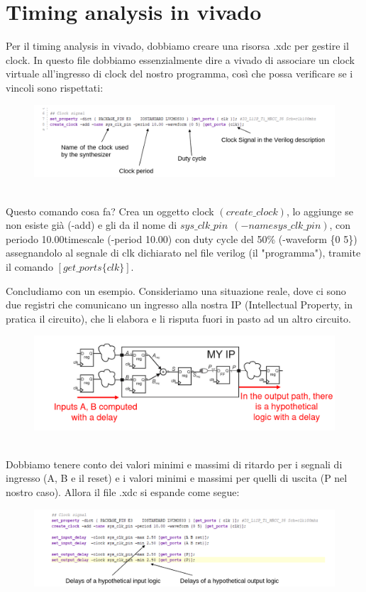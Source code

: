 \documentclass{book}
\begin{document}
    \section{Timing analysis in vivado}
    Per il timing analysis in vivado, dobbiamo creare una risorsa .xdc per gestire il clock.
    In questo file dobbiamo essenzialmente dire a vivado di associare un clock virtuale all'ingresso
    di clock del nostro programma, così che possa verificare se i vincoli sono rispettati:
    \begin{figure}[h!]
        \center  
        \includegraphics[width=0.7\linewidth]{img/chapt12img11.png}
    \end{figure} \\
    Questo comando cosa fa? Crea un oggetto clock $(create \_ clock)$, lo aggiunge se non esiste già (-add)
    e gli da il nome di $sys \_ clk \_ pin \ \ (-name sys\_clk\_pin)$, con periodo 10.00timescale (-period 10.00) con
    duty cycle del 50\% (-waveform \{0 5\}) assegnandolo al segnale di clk  dichiarato nel file verilog (il "programma"),
    tramite il comando $[get\_ports\{clk\}]$.

    Concludiamo con un esempio. Consideriamo una situazione reale, dove ci sono due 
    registri che comunicano un ingresso alla nostra IP (Intellectual Property, in pratica il circuito), che li 
    elabora e li risputa fuori in pasto ad un altro circuito.
    \begin{figure}[h!]
        \center  
        \includegraphics[width=0.6\linewidth]{img/chapt12img12.png}
    \end{figure} \\
    Dobbiamo tenere conto dei valori minimi e massimi di ritardo per i segnali di ingresso (A, B e il reset)
    e i valori minimi e massimi per quelli di uscita (P nel nostro caso). Allora il file .xdc si espande come segue:
    \begin{figure}[h!]
        \center 
        \includegraphics[width=0.75\linewidth]{img/chapt12img13.png}
    \end{figure}
\end{document}
